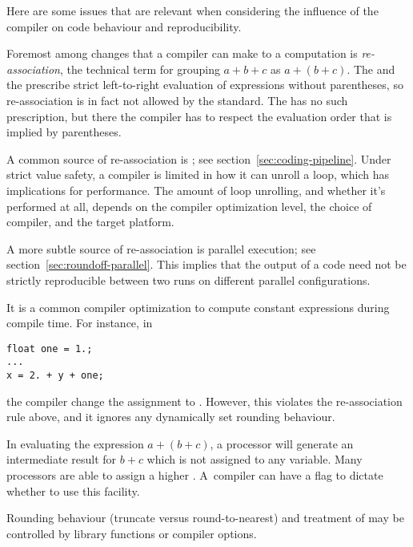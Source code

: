 Here are some issues that are relevant
when considering the influence of the compiler
on code behaviour and reproducibility.

Foremost among changes that a compiler can
make to a computation is \emph{re-association}, the technical
term for grouping $a+b+c$ as $a+(b+c)$. The  and the  prescribe
strict left-to-right evaluation of expressions without parentheses, so
re-association is in fact not allowed by the standard. The
 has no such prescription,
but there the compiler has to respect the evaluation order that is
implied by parentheses.

A common source of re-association is ; see
section~\ref{sec:coding-pipeline}. Under strict value safety,
a compiler is limited in how it can unroll a loop, which has implications
for performance. The amount of loop unrolling,
and whether it's performed at all, depends on the compiler optimization level,
the choice of compiler, and the target platform.

A more subtle source of re-association is parallel execution; 
see section~\ref{sec:roundoff-parallel}. This implies that the output
of a code need not be strictly reproducible between two runs on
different parallel configurations.


%
It is a common compiler optimization to compute constant expressions
during compile time. For instance, in
\begin{verbatim}
float one = 1.;
...
x = 2. + y + one;
\end{verbatim}
the compiler change the assignment to . However, this
violates the re-association rule above, and it ignores any dynamically
set rounding behaviour.

In evaluating the expression $a+(b+c)$, a processor will generate an 
intermediate result for $b+c$ which is not assigned to any variable.
Many processors are able to assign a higher 
.
A~compiler can have a flag to dictate whether to use this facility.

%
Rounding behaviour (truncate versus round-to-nearest) and treatment of
 may be controlled by library
functions or compiler options.

